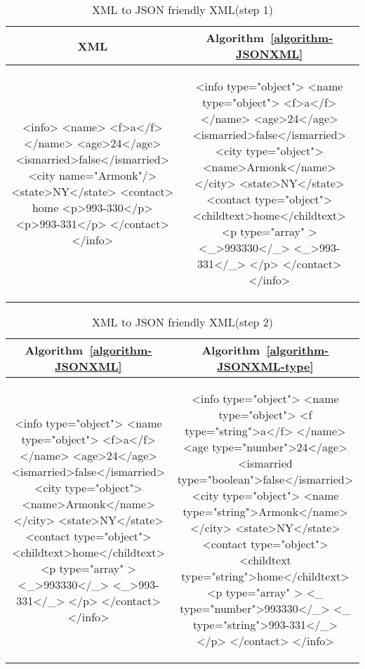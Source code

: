 \begin{longtable}{c|c}
	\caption{XML to JSON friendly XML(step 1)}
	\label{tbl:xmljson}\\
	\textbf{XML} & \textbf{ Algorithm~\ref{algorithm-JSONXML} }\\
	\hline
\begin{minipage}{.4\textwidth}
\begin{fakeXML}
<info>
  <name>
    <f>a</f>
  </name>
  <age>24</age>
  <ismarried>false</ismarried>
  <city name="Armonk"/>
  <state>NY</state>
  <contact>
	 home
    <p>993-330</p>
    <p>993-331</p>
  </contact>
</info>
\end{fakeXML}	
\end{minipage} &
\begin{minipage}{.55\textwidth}
\begin{fakeXML}
<info type="object">
  <name type="object">
    <f>a</f>
  </name>
  <age>24</age>
  <ismarried>false</ismarried>
  <city type="object">
    <name>Armonk</name>
  </city>
  <state>NY</state>
  <contact type="object">
	<childtext>home</childtext>
    <p  type="array" >
	   <_>993330</_>
	   <_>993-331</_>
    </p>
  </contact>
</info>
\end{fakeXML}
\end{minipage}\\
\end{longtable}

\begin{longtable}{c|c}
	\caption{XML to JSON friendly XML(step 2)}
	\label{tbl:xmljson-2}\\
	\textbf{Algorithm~\ref{algorithm-JSONXML}} & \textbf{ Algorithm~\ref{algorithm-JSONXML-type} }\\
	\hline
\begin{minipage}{.4\textwidth}
\begin{fakeXML}
<info type="object">
  <name type="object">
    <f>a</f>
  </name>
  <age>24</age>
  <ismarried>false</ismarried>
  <city type="object">
    <name>Armonk</name>
  </city>
  <state>NY</state>
  <contact type="object">
	 <childtext>home</childtext>
    <p  type="array" >
	   <_>993330</_>
	   <_>993-331</_>
    </p>
  </contact>
</info>
\end{fakeXML}	
\end{minipage} &
\begin{minipage}{.55\textwidth}
\begin{fakeXML}
<info type="object">
  <name type="object">
    <f type="string">a</f>
  </name>
  <age type="number">24</age>
  <ismarried type="boolean">false</ismarried>
  <city type="object">
    <name type="string">Armonk</name>
  </city>
  <state>NY</state>
  <contact type="object">
	 <childtext type="string">home</childtext>
    <p  type="array" >
	   <_ type="number">993330</_>
	   <_ type="string">993-331</_>
    </p>
  </contact>
</info>
\end{fakeXML}
\end{minipage}\\
\end{longtable}

